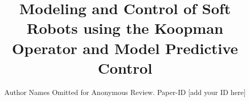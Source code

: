 \documentclass[conference]{IEEEtran}
\begin{document}
\title{Modeling and Control of Soft Robots using the Koopman Operator and Model Predictive Control}

\author{Author Names Omitted for Anonymous Review. Paper-ID [add your ID here]}





% 


\maketitle
\end{document}
